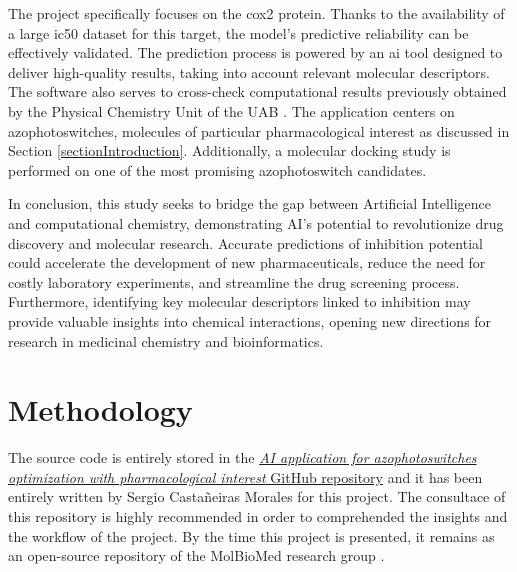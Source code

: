 \documentclass[11pt]{article}
\begin{document}
The project specifically focuses on the \gls{cox2} protein. Thanks to the availability of a large \gls{ic50} dataset for this target, the model’s predictive reliability can be effectively validated. The prediction process is powered by an \gls{ai} tool designed to deliver high-quality results, taking into account relevant molecular descriptors. The software also serves to cross-check computational results previously obtained by the Physical Chemistry Unit of the UAB \cite{UAB_ComputationalChemistry}. The application centers on azophotoswitches, molecules of particular pharmacological interest as discussed in Section \ref{sectionIntroduction}. Additionally, a molecular docking study is performed on one of the most promising azophotoswitch candidates.

In conclusion, this study seeks to bridge the gap between Artificial Intelligence and computational chemistry, demonstrating AI’s potential to revolutionize drug discovery and molecular research. Accurate predictions of inhibition potential could accelerate the development of new pharmaceuticals, reduce the need for costly laboratory experiments, and streamline the drug screening process. Furthermore, identifying key molecular descriptors linked to inhibition may provide valuable insights into chemical interactions, opening new directions for research in medicinal chemistry and bioinformatics.

\newpage
\section{Methodology}\label{sectionMethodology}
The source code is entirely stored in the \href{https://github.com/SirSergi0/Repository---AI-application-for-azophotoswitches-optimization-with-pharmacological-interest}{\emph{AI application for azophotoswitches optimization with pharmacological interest} GitHub repository}\cite{GitHub} and it has been entirely written by Sergio Castañeiras Morales for this project\cite{azophotoswitches2025}. The consultace of this repository is highly recommended in order to comprehended the insights and the workflow of the project. By the time this project is presented, it remains as an open-source repository of the MolBioMed research group \cite{molbiomed}.
\end{document}
